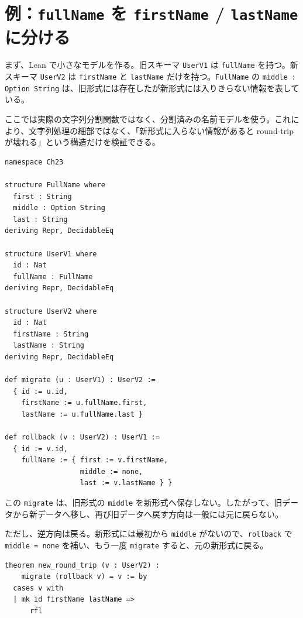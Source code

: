\section{例：\texttt{fullName} を \texttt{firstName} / \texttt{lastName} に分ける}

まず、Lean で小さなモデルを作る。旧スキーマ \texttt{UserV1} は \texttt{fullName} を持つ。新スキーマ \texttt{UserV2} は \texttt{firstName} と \texttt{lastName} だけを持つ。\texttt{FullName} の \texttt{middle : Option String} は、旧形式には存在したが新形式には入りきらない情報を表している。

\begin{leanbox}
ここでは実際の文字列分割関数ではなく、分割済みの名前モデルを使う。これにより、文字列処理の細部ではなく、「新形式に入らない情報があると round-trip が壊れる」という構造だけを検証できる。
\end{leanbox}

\begin{listing}[htbp]
\begin{verbatim}
namespace Ch23

structure FullName where
  first : String
  middle : Option String
  last : String
deriving Repr, DecidableEq

structure UserV1 where
  id : Nat
  fullName : FullName
deriving Repr, DecidableEq

structure UserV2 where
  id : Nat
  firstName : String
  lastName : String
deriving Repr, DecidableEq

def migrate (u : UserV1) : UserV2 :=
  { id := u.id,
    firstName := u.fullName.first,
    lastName := u.fullName.last }

def rollback (v : UserV2) : UserV1 :=
  { id := v.id,
    fullName := { first := v.firstName,
                  middle := none,
                  last := v.lastName } }
\end{verbatim}
\caption{旧形式・新形式・移行関数}
\label{lst:ch23-model}
\end{listing}

この \texttt{migrate} は、旧形式の \texttt{middle} を新形式へ保存しない。したがって、旧データから新データへ移し、再び旧データへ戻す方向は一般には元に戻らない。

ただし、逆方向は戻る。新形式には最初から \texttt{middle} がないので、\texttt{rollback} で \texttt{middle = none} を補い、もう一度 \texttt{migrate} すると、元の新形式に戻る。

\begin{listing}[htbp]
\begin{verbatim}
theorem new_round_trip (v : UserV2) :
    migrate (rollback v) = v := by
  cases v with
  | mk id firstName lastName =>
      rfl
\end{verbatim}
\caption{新形式については round-trip が成立する}
\label{lst:ch23-new-roundtrip}
\end{listing}

